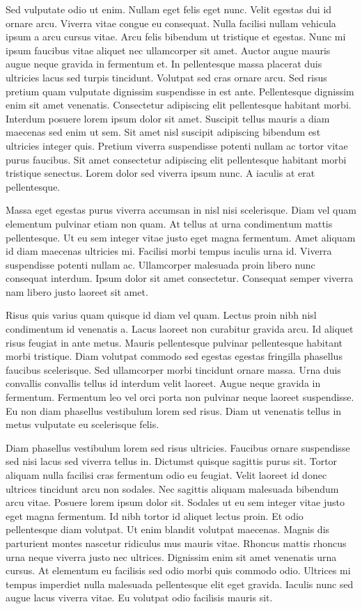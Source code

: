 \documentclass[11pt,a4paper]{article}
\begin{document}
Sed vulputate odio ut enim. Nullam eget felis eget nunc. Velit egestas dui id ornare arcu. Viverra vitae congue eu consequat. Nulla facilisi nullam vehicula ipsum a arcu cursus vitae. Arcu felis bibendum ut tristique et egestas. Nunc mi ipsum faucibus vitae aliquet nec ullamcorper sit amet. Auctor augue mauris augue neque gravida in fermentum et. In pellentesque massa placerat duis ultricies lacus sed turpis tincidunt. Volutpat sed cras ornare arcu. Sed risus pretium quam vulputate dignissim suspendisse in est ante. Pellentesque dignissim enim sit amet venenatis. Consectetur adipiscing elit pellentesque habitant morbi. Interdum posuere lorem ipsum dolor sit amet. Suscipit tellus mauris a diam maecenas sed enim ut sem. Sit amet nisl suscipit adipiscing bibendum est ultricies integer quis. Pretium viverra suspendisse potenti nullam ac tortor vitae purus faucibus. Sit amet consectetur adipiscing elit pellentesque habitant morbi tristique senectus. Lorem dolor sed viverra ipsum nunc. A iaculis at erat pellentesque.

Massa eget egestas purus viverra accumsan in nisl nisi scelerisque. Diam vel quam elementum pulvinar etiam non quam. At tellus at urna condimentum mattis pellentesque. Ut eu sem integer vitae justo eget magna fermentum. Amet aliquam id diam maecenas ultricies mi. Facilisi morbi tempus iaculis urna id. Viverra suspendisse potenti nullam ac. Ullamcorper malesuada proin libero nunc consequat interdum. Ipsum dolor sit amet consectetur. Consequat semper viverra nam libero justo laoreet sit amet.

Risus quis varius quam quisque id diam vel quam. Lectus proin nibh nisl condimentum id venenatis a. Lacus laoreet non curabitur gravida arcu. Id aliquet risus feugiat in ante metus. Mauris pellentesque pulvinar pellentesque habitant morbi tristique. Diam volutpat commodo sed egestas egestas fringilla phasellus faucibus scelerisque. Sed ullamcorper morbi tincidunt ornare massa. Urna duis convallis convallis tellus id interdum velit laoreet. Augue neque gravida in fermentum. Fermentum leo vel orci porta non pulvinar neque laoreet suspendisse. Eu non diam phasellus vestibulum lorem sed risus. Diam ut venenatis tellus in metus vulputate eu scelerisque felis.

Diam phasellus vestibulum lorem sed risus ultricies. Faucibus ornare suspendisse sed nisi lacus sed viverra tellus in. Dictumst quisque sagittis purus sit. Tortor aliquam nulla facilisi cras fermentum odio eu feugiat. Velit laoreet id donec ultrices tincidunt arcu non sodales. Nec sagittis aliquam malesuada bibendum arcu vitae. Posuere lorem ipsum dolor sit. Sodales ut eu sem integer vitae justo eget magna fermentum. Id nibh tortor id aliquet lectus proin. Et odio pellentesque diam volutpat. Ut enim blandit volutpat maecenas. Magnis dis parturient montes nascetur ridiculus mus mauris vitae. Rhoncus mattis rhoncus urna neque viverra justo nec ultrices. Dignissim enim sit amet venenatis urna cursus. At elementum eu facilisis sed odio morbi quis commodo odio. Ultrices mi tempus imperdiet nulla malesuada pellentesque elit eget gravida. Iaculis nunc sed augue lacus viverra vitae. Eu volutpat odio facilisis mauris sit.
\end{document}
